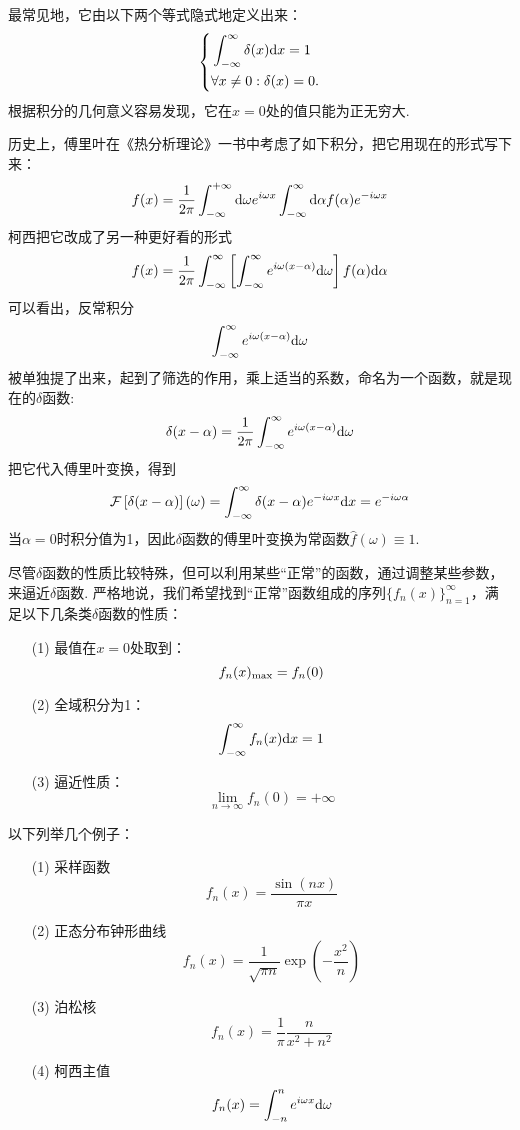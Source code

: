 \documentclass[UTF8]{ctexart}
\newcommand{\trm}[1]{{\rm #1}}
\begin{document}
最常见地，它由以下两个等式隐式地定义出来：
\[\left\{\begin{aligned} & \int_{-\infty}^{\infty}\delta(x)\trm{d}x=1 \\ & \forall x \neq 0: \delta(x)=0. \end{aligned}\right.\]
根据积分的几何意义容易发现，它在\(x=0\)处的值只能为正无穷大.

历史上，傅里叶在《热分析理论》一书中考虑了如下积分，把它用现在的形式写下来：
\[f(x) = \frac{1}{2\pi}\int_{-\infty}^{+\infty}\trm{d}\omega e^{i\omega x} \int_{-\infty}^{\infty}\trm{d}\alpha f(\alpha)e^{-i\omega x}\]
柯西把它改成了另一种更好看的形式
\[f(x) = \frac{1}{2\pi}\int_{-\infty}^{\infty}\left[\int_{-\infty}^{\infty}e^{i\omega(x-\alpha)}\trm{d}\omega\right]f(\alpha)\trm{d}\alpha\]
可以看出，反常积分\[\int_{-\infty}^{\infty}e^{i\omega(x-\alpha)}\trm{d}\omega\]被单独提了出来，起到了筛选的作用，乘上适当的系数，命名为一个函数，就是现在的\(\delta\)函数:
\[\delta(x-\alpha)=\frac{1}{2\pi}\int_{-\infty}^{\infty}e^{i\omega(x-\alpha)}\trm{d}\omega\]
把它代入傅里叶变换，得到
\[\mathcal{F}\left[\delta(x-\alpha)\right](\omega) = \int_{-\infty}^{\infty}\delta(x-\alpha)e^{-i\omega x}\trm{d}x = e^{-i\omega\alpha}\]
当\(\alpha=0\)时积分值为1，因此\(\delta\)函数的傅里叶变换为常函数\(\hat{f}(\omega)\equiv 1\).

\vspace{1cm}

尽管\(\delta\)函数的性质比较特殊，但可以利用某些“正常”的函数，通过调整某些参数，来逼近\(\delta\)函数. 严格地说，我们希望找到“正常”函数组成的序列\(\{f_n(x)\}_{n=1}^{\infty}\)，满足以下几条类\(\delta\)函数的性质：
\begin{itemize}
    \item[(1)] 最值在\(x=0\)处取到：\[f_n(x)_{\trm{max}}=f_n(0)\]
    \item[(2)] 全域积分为1：\[\int_{-\infty}^{\infty}f_n(x)\trm{d}x=1\] 
    \item[(3)] 逼近性质：\[\lim_{n\to\infty}f_n(0)=+\infty\] 
\end{itemize}
以下列举几个例子：
\begin{itemize}
    \item [(1)] 采样函数
    \[f_n(x)=\frac{\sin(nx)}{\pi x}\]
    \item [(2)] 正态分布钟形曲线
    \[f_n(x)=\frac{1}{\sqrt{\pi n}}\exp\left(-\frac{x^2}{n}\right)\]
    \item [(3)] 泊松核
    \[f_n(x) = \frac{1}{\pi}\frac{n}{x^2+n^2}\]
    \item [(4)] 柯西主值
    \[f_n(x) = \int_{-n}^{n}e^{i\omega x}\trm{d}\omega\]
\end{itemize}
\end{document}
